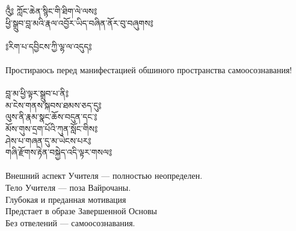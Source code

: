 \ru
\normalsize
{}

{\ti འུྃ༔ ཀློང་ཆེན་སྙིང་གི་ཐིག་ལེ་ལས༔\\
ཕྱི་སྒྲུབ་བླ་མའི་རྣལ་འབྱོར་ཡིད་བཞིན་ནོར་བུ་བཞུགས༔}\\
\\

{\ti ༔རིག་པ་དབྱིངས་ཀྱི་ལྷ་ལ་འདུད༔}\\
\\
\ru Простираюсь перед манифестацией обшиного пространства самоосознавания!\\
\\
{\ti བླ་མ་ཕྱི་ལྟར་སྒྲུབ་པ་ནི༔\\
མ་ངེས་གནས་སྐབས་ཐམས་ཅད་དུ༔\\
ལུས་ནི་རྣམ་སྣང་ཆོས་བདུན་དང་༔\\
མོས་གུས་དྲག་པོའི་ཀུན་སློང་གིས༔\\
ཤེས་པ་གཞན་དུ་མ་ཡེངས་པར༔\\
གཞི་རྫོགས་རྟེན་བསྐྱེད་འདི་ལྟར་གསལ༔}\\
\\
\ru Внешний аспект Учителя — полностью неопределен.\\
Тело Учителя — поза Вайрочаны.\\
Глубокая и преданная мотивация\\
Предстает в образе Завершенной Основы\\
Без отвелений — самоосознавания.\\
\\
